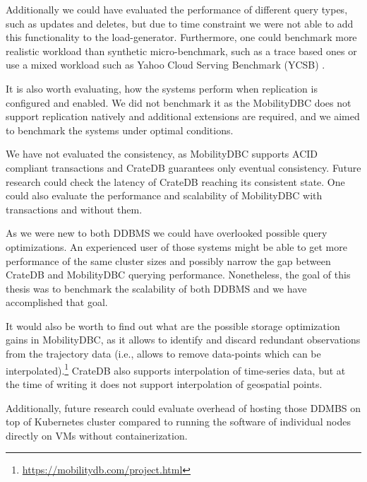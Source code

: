 Additionally we could have evaluated the performance of different query types, such as updates and deletes, but due to time constraint we were not able to add this functionality to the load-generator.
Furthermore, one could benchmark more realistic workload than synthetic micro-benchmark, such as a trace based ones or use a mixed workload such as Yahoo Cloud Serving Benchmark (YCSB) \cite{cooperBenchmarkingCloudServing2010}.

It is also worth evaluating, how the systems perform when replication is configured and enabled.
We did not benchmark it as the MobilityDBC does not support replication natively and additional extensions are required, and we aimed to benchmark the systems under optimal conditions.

We have not evaluated the consistency, as MobilityDBC supports ACID compliant transactions and CrateDB guarantees only eventual consistency.
Future research could check the latency of CrateDB reaching its consistent state.
One could also evaluate the performance and scalability of MobilityDBC with transactions and without them.

As we were new to both DDBMS we could have overlooked possible query optimizations.
An experienced user of those systems might be able to get more performance of the same cluster sizes and possibly narrow the gap between CrateDB and MobilityDBC querying performance.
Nonetheless, the goal of this thesis was to benchmark the scalability of both DDBMS and we have accomplished that goal.

It would also be worth to find out what are the possible storage optimization gains in MobilityDBC, as it allows to identify and discard redundant observations from the trajectory data
(i.e., allows to remove data-points which can be interpolated).\footnote{\url{https://mobilitydb.com/project.html}}
CrateDB also supports interpolation of time-series data, but at the time of writing it does not support interpolation of geospatial points.

Additionally, future research could evaluate overhead of hosting those DDMBS on top of Kubernetes cluster compared to running the software of individual nodes directly on VMs without containerization.

